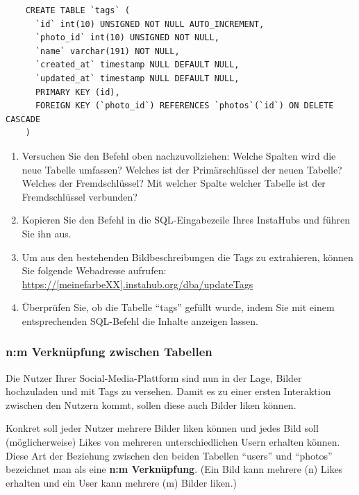 \begin{myexercise}
  \begin{lstlisting}
    CREATE TABLE `tags` (
      `id` int(10) UNSIGNED NOT NULL AUTO_INCREMENT,
      `photo_id` int(10) UNSIGNED NOT NULL,
      `name` varchar(191) NOT NULL,
      `created_at` timestamp NULL DEFAULT NULL,
      `updated_at` timestamp NULL DEFAULT NULL,
      PRIMARY KEY (id),
      FOREIGN KEY (`photo_id`) REFERENCES `photos`(`id`) ON DELETE CASCADE
    )
  \end{lstlisting}
  \begin{enumerate}
    \item Versuchen Sie den Befehl oben nachzuvollziehen: Welche Spalten wird die neue Tabelle umfassen? Welches ist der Primärschlüssel der neuen Tabelle? Welches der Fremdschlüssel? Mit welcher Spalte welcher Tabelle ist der Fremdschlüssel verbunden?
    \item  Kopieren Sie den Befehl in die SQL-Eingabezeile Ihres InstaHubs und führen Sie ihn aus.
    \item Um aus den bestehenden Bildbeschreibungen die Tags zu extrahieren, können Sie folgende
    Webadresse aufrufen: \url{https://[meinefarbeXX].instahub.org/dba/updateTags}
    \item Überprüfen Sie, ob die Tabelle \enquote{tags} gefüllt wurde, indem Sie mit einem entsprechenden SQL-Befehl die Inhalte anzeigen lassen.
  \end{enumerate}

\end{myexercise}


\subsubsection{n:m Verknüpfung zwischen Tabellen}
Die Nutzer Ihrer Social-Media-Plattform sind nun in der Lage, Bilder hochzuladen und mit Tags zu versehen. Damit es zu einer ersten Interaktion zwischen den Nutzern kommt, sollen diese auch Bilder liken können.

Konkret soll jeder Nutzer mehrere Bilder liken können und jedes Bild soll (möglicherweise) Likes von mehreren unterschiedlichen Usern erhalten können. Diese Art der Beziehung zwischen den beiden Tabellen \enquote{users} und \enquote{photos} bezeichnet man als eine \textbf{n:m Verknüpfung}. (Ein Bild kann mehrere (n) Likes erhalten und ein User kann mehrere (m) Bilder liken.)

